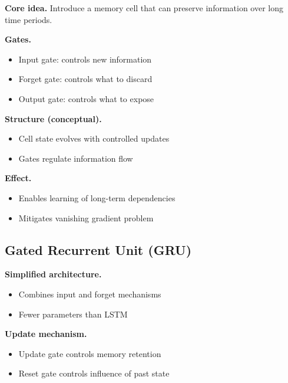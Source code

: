\medskip

\noindent
\textbf{Core idea.}  
Introduce a memory cell that can preserve information over long time periods.

\medskip

\noindent
\textbf{Gates.}
\begin{itemize}
    \item Input gate: controls new information
    \item Forget gate: controls what to discard
    \item Output gate: controls what to expose
\end{itemize}

\medskip

\noindent
\textbf{Structure (conceptual).}
\begin{itemize}
    \item Cell state evolves with controlled updates
    \item Gates regulate information flow
\end{itemize}

\medskip

\noindent
\textbf{Effect.}
\begin{itemize}
    \item Enables learning of long-term dependencies
    \item Mitigates vanishing gradient problem
\end{itemize}

\subsection{Gated Recurrent Unit (GRU)}

\medskip

\noindent
\textbf{Simplified architecture.}
\begin{itemize}
    \item Combines input and forget mechanisms
    \item Fewer parameters than LSTM
\end{itemize}

\medskip

\noindent
\textbf{Update mechanism.}
\begin{itemize}
    \item Update gate controls memory retention
    \item Reset gate controls influence of past state
\end{itemize}

\medskip

